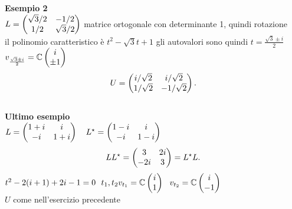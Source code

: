 \documentclass[12px]{article}
\begin{document}
	\textbf{Esempio 2}\\
		$L = \begin{pmatrix}\sqrt{3}/2&-1/2\\1/2&\sqrt{3}/2\end{pmatrix}$ matrice ortogonale con determinante 1, quindi rotazione\\
		il polinomio caratteristico è $t^2 - \sqrt 3 t + 1$ gli autovalori sono quindi $t = \frac {\sqrt{3}\pm i}{2}$
		$v_{\frac {\sqrt{3}\pm i}{2}} = \mathbb{C}\begin{pmatrix}i\\\pm 1\end{pmatrix}$
		 \[
			 U = \begin{pmatrix}i/\sqrt 2 & i/\sqrt 2\\ 1/\sqrt 2 & - 1/\sqrt 2\end{pmatrix}
		.\] 
		\hline \ \\[10px]
		\textbf{Ultimo esempio}\\[8px]
			 $L = \matrice{1 +i&i\\-i&1+i} \ \ \ L^\star = \matrice{1-i&i\\-i&1-i}\\$
			 \[
				 LL^\star = \begin{pmatrix}3&2i\\-2i&3\end{pmatrix} = L^\star L
			 .\] 
			 $t^2 - 2(i + 1) + 2i - 1 = 0\ \ t_1,t_2\\
			 v_{t_1} = \mathbb{C}\begin{pmatrix}i\\1\end{pmatrix} \ \ v_{t_2} = \mathbb{C}\begin{pmatrix}i\\-1\end{pmatrix}$\\
			 $U$ come nell'esercizio precedente
\end{document}
